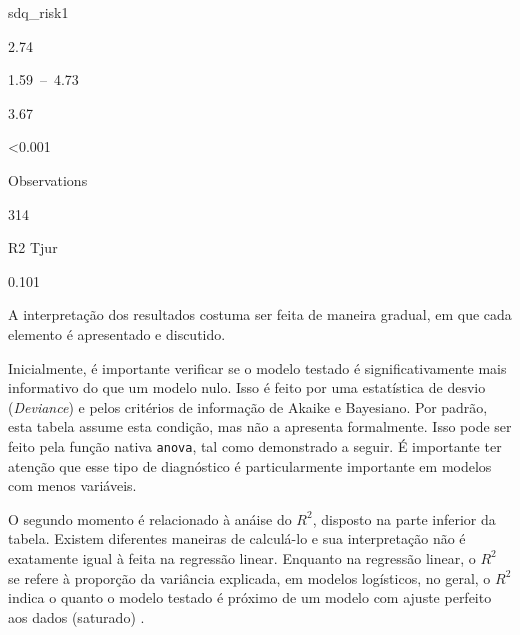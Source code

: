 \documentclass[
]{book}
\newenvironment{Shaded}{\begin{snugshade}}{\end{snugshade}}
\newcommand{\CommentTok}[1]{\textcolor[rgb]{0.56,0.35,0.01}{\textit{#1}}}
\newcommand{\DataTypeTok}[1]{\textcolor[rgb]{0.13,0.29,0.53}{#1}}
\newcommand{\DecValTok}[1]{\textcolor[rgb]{0.00,0.00,0.81}{#1}}
\newcommand{\KeywordTok}[1]{\textcolor[rgb]{0.13,0.29,0.53}{\textbf{#1}}}
\newcommand{\NormalTok}[1]{#1}
\newcommand{\OperatorTok}[1]{\textcolor[rgb]{0.81,0.36,0.00}{\textbf{#1}}}
\newcommand{\StringTok}[1]{\textcolor[rgb]{0.31,0.60,0.02}{#1}}
\begin{document}
sdq\_risk1

2.74

1.59~--~4.73

3.67

\textless0.001

Observations

314

R2 Tjur

0.101

A interpretação dos resultados costuma ser feita de maneira gradual, em que cada elemento é apresentado e discutido.

Inicialmente, é importante verificar se o modelo testado é significativamente mais informativo do que um modelo nulo. Isso é feito por uma estatística de desvio (\emph{Deviance}) e pelos critérios de informação de Akaike e Bayesiano. Por padrão, esta tabela assume esta condição, mas não a apresenta formalmente. Isso pode ser feito pela função nativa \texttt{anova}, tal como demonstrado a seguir. É importante ter atenção que esse tipo de diagnóstico é particularmente importante em modelos com menos variáveis.

\begin{Shaded}
\end{Shaded}

O segundo momento é relacionado à anáise do \(R^2\), disposto na parte inferior da tabela. Existem diferentes maneiras de calculá-lo e sua interpretação não é exatamente igual à feita na regressão linear. Enquanto na regressão linear, o \(R^2\) se refere à proporção da variância explicada, em modelos logísticos, no geral, o \(R^2\) indica o quanto o modelo testado é próximo de um modelo com ajuste perfeito aos dados (saturado) \citep{portugues2020}.
\end{document}
